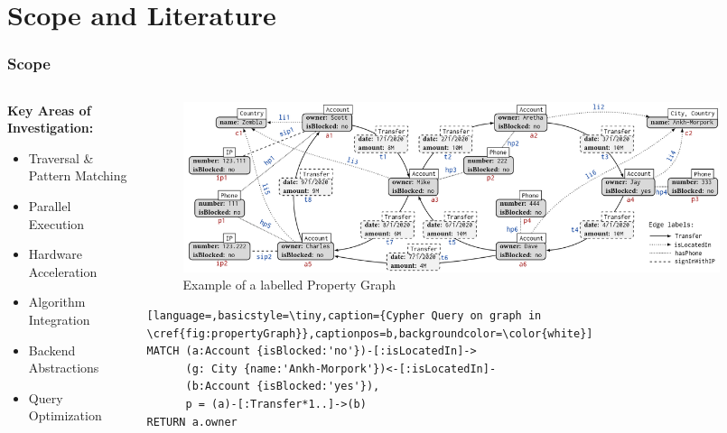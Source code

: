 \documentclass[
	aspectratio=169,
	compress,
]{beamer}
\newenvironment{graytext}{\color{ovgu-lightgray}}{\ignorespacesafterend}
\newcommand{\navframetitle}[1]{\frametitle{#1\hfill{\footnotesize\lastsection{}}}}
\begin{document}
\section{Scope and Literature}
\label{sec:background}

\begin{frame}[fragile]
	\navframetitle{Scope}

	\begin{columns}[T]
		\begin{column}{0.4\textwidth}
\vspace{2em}
			\textbf{Key Areas of Investigation:}
			\begin{itemize}
				\item Traversal \& Pattern Matching
				\item Parallel Execution %
				\item Hardware Acceleration %
				\item Algorithm Integration %
                \begin{graytext}
				\item Backend Abstractions %
				\item Query Optimization
                \end{graytext}
			\end{itemize}
		\end{column}
		\begin{column}{0.6\textwidth}
                \centering
            \begin{figure}
                \centering
                \includegraphics[width=0.95\textwidth]{./figures/propertyGraph.png}
                \captionsetup{justification=centering}
                \caption{Example of a labelled Property Graph \cite{DBLP:GraphPatternMatchinginGQL}}
                \label{fig:propertyGraph}
            \end{figure}
            \vspace{-1em}
                \begin{lstlisting}[language=,basicstyle=\tiny,caption={Cypher Query on graph in \cref{fig:propertyGraph}},captionpos=b,backgroundcolor=\color{white}]
MATCH (a:Account {isBlocked:'no'})-[:isLocatedIn]->
      (g: City {name:'Ankh-Morpork'})<-[:isLocatedIn]-
      (b:Account {isBlocked:'yes'}),
      p = (a)-[:Transfer*1..]->(b)
RETURN a.owner
                \end{lstlisting}
		\end{column}
	\end{columns}
\end{frame}
\end{document}
